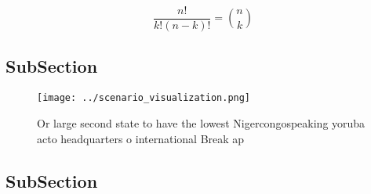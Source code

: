 \documentclass[a4paper]{article}
\begin{document}
\[ \frac{n!}{k!(n-k)!} = \binom{n}{k} \]

\subsection{SubSection}

\begin{figure}
\centering
\texttt{[image: ../scenario\_visualization.png]}
\caption{Or large second state to have the lowest Nigercongospeaking yoruba acto headquarters o international Break ap
}
\end{figure}
 
\subsection{SubSection}
\end{document}

